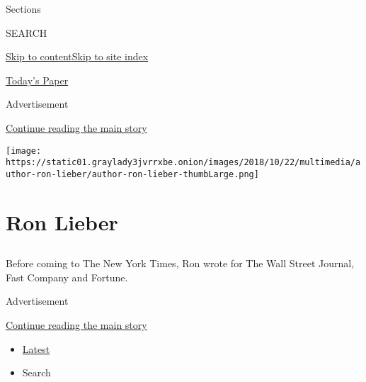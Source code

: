 Sections

SEARCH

\protect\hyperlink{site-content}{Skip to
content}\protect\hyperlink{site-index}{Skip to site index}

\href{https://myaccount.nytimes3xbfgragh.onion/auth/login?response_type=cookie\&client_id=vi}{}

\href{https://www.nytimes3xbfgragh.onion/section/todayspaper}{Today's
Paper}

Advertisement

\protect\hyperlink{after-top}{Continue reading the main story}

\texttt{[image: https://static01.graylady3jvrrxbe.onion/images/2018/10/22/multimedia/author-ron-lieber/author-ron-lieber-thumbLarge.png]}

\hypertarget{ron-lieber}{%
\section{Ron Lieber}\label{ron-lieber}}

\subsection{}

Before coming to The New York Times, Ron wrote for The Wall Street
Journal, Fast Company and Fortune.~

Advertisement

\protect\hyperlink{after-mid1}{Continue reading the main story}

\begin{itemize}
\tightlist
\item
  \protect\hyperlink{stream-panel}{Latest}
\item
  Search
\end{itemize}

